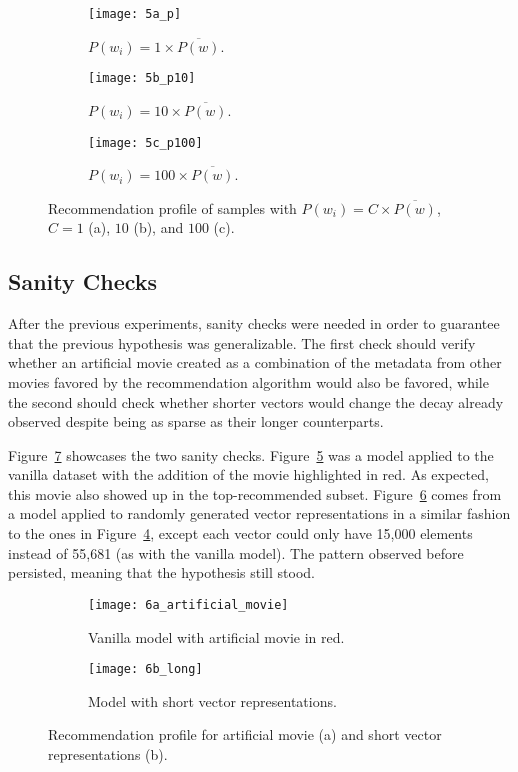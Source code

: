 \begin{figure}
  \centering
  \begin{subfigure}{0.3\textwidth}
    \centering
    \texttt{[image: 5a\_p]}
    \caption{$P(w_{i}) = 1 \times \overline{P(w)}$.\label{fig:fig5a}}
  \end{subfigure}
  \begin{subfigure}{0.3\textwidth}
    \centering
    \texttt{[image: 5b\_p10]}
    \caption{$P(w_{i}) = 10 \times \overline{P(w)}$.\label{fig:fig5b}}
  \end{subfigure}
  \begin{subfigure}{0.3\textwidth}
    \centering
    \texttt{[image: 5c\_p100]}
    \caption{$P(w_{i}) = 100 \times \overline{P(w)}$.\label{fig:fig5c}}
  \end{subfigure}
  \caption{Recommendation profile of samples with
    $P(w_{i}) = C \times \overline{P(w)}$, $C = 1$ (a), $10$ (b), and $100$
    (c).\label{fig:fig5}}
\end{figure}

\subsection{Sanity Checks}
\label{subsec:sanity03}

After the previous experiments, sanity checks were needed in order to guarantee
that the previous hypothesis was generalizable. The first check should verify
whether an artificial movie created as a combination of the metadata from other
movies favored by the recommendation algorithm would also be favored, while the
second should check whether shorter vectors would change the decay already
observed despite being as sparse as their longer counterparts.

Figure~\ref{fig:fig6} showcases the two sanity checks. Figure~\ref{fig:fig6a}
was a model applied to the vanilla dataset with the addition of the movie
highlighted in red. As expected, this movie also showed up in the
top-recommended subset. Figure~\ref{fig:fig6b} comes from a model applied to
randomly generated vector representations in a similar fashion to the ones in
Figure~\ref{fig:fig5}, except each vector could only have 15,000 elements
instead of 55,681 (as with the vanilla model). The pattern observed before
persisted, meaning that the hypothesis still stood.

\begin{figure}
  \centering
  \begin{subfigure}{0.45\textwidth}
    \centering
    \texttt{[image: 6a\_artificial\_movie]}
    \caption{Vanilla model with artificial movie in red.\label{fig:fig6a}}
  \end{subfigure}
  \begin{subfigure}{0.45\textwidth}
    \centering
    \texttt{[image: 6b\_long]}
    \caption{Model with short vector representations.\label{fig:fig6b}}
  \end{subfigure}
  \caption{Recommendation profile for artificial movie (a) and short vector
    representations (b).\label{fig:fig6}}
\end{figure}

